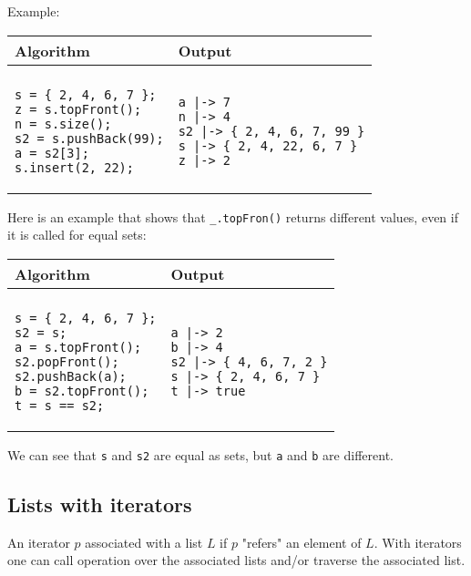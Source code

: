 \documentclass[a4paper]{report}
\begin{document}
Example:
\begin{center}
\begin{tabular}{ll}
Algorithm & Output\\
\hline
\\
\begin{minipage}{.45\textwidth}
\begin{verbatim}
s = { 2, 4, 6, 7 };
z = s.topFront();
n = s.size();
s2 = s.pushBack(99);
a = s2[3];
s.insert(2, 22);
\end{verbatim}
\end{minipage}
&
\begin{minipage}{.45\textwidth}
\begin{verbatim}
a |-> 7
n |-> 4
s2 |-> { 2, 4, 6, 7, 99 }
s |-> { 2, 4, 22, 6, 7 }
z |-> 2
\end{verbatim}
\end{minipage}
\end{tabular}
\end{center}
Here is an example that shows that {\tt \_.topFron()} returns different values, even if it is called for equal sets:
\begin{center}
\begin{tabular}{ll}
Algorithm & Output\\
\hline
\\
\begin{minipage}{.45\textwidth}
\begin{verbatim}
s = { 2, 4, 6, 7 };
s2 = s;
a = s.topFront();
s2.popFront();
s2.pushBack(a);
b = s2.topFront();
t = s == s2;
\end{verbatim}
\end{minipage}
&
\begin{minipage}{.45\textwidth}
\begin{verbatim}
a |-> 2
b |-> 4
s2 |-> { 4, 6, 7, 2 }
s |-> { 2, 4, 6, 7 }
t |-> true
\end{verbatim}
\end{minipage}
\end{tabular}
\end{center}
We can see that {\tt s} and {\tt s2} are equal as sets, but {\tt a} and {\tt b} are different.

\subsection{Lists with iterators}

An iterator $p$ associated with a list $L$ if $p$ "refers" an element of $L$. With iterators one can call operation over the associated lists and/or traverse the associated list.
\end{document}
